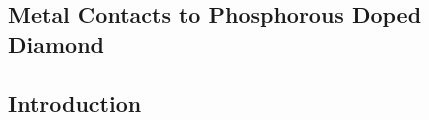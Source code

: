 \begin{refsection}
\chapter{Metal Contacts to Phosphorous Doped Diamond}
\label{ch:electrical_experiments}
\ifpdf
    \graphicspath{{Chapter3/Figs/Raster/}{Chapter3/Figs/PDF/}{Chapter3/Figs/}}
\else
    \graphicspath{{Chapter3/Figs/Vector/}{Chapter3/Figs/}}
\fi

\section{Introduction}

\end{refsection}
